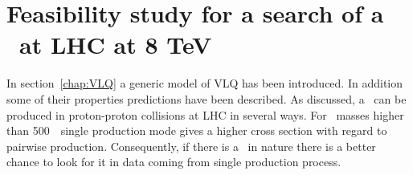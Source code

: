 %
%
%
%
%
%

\chapter{Feasibility study for a search of a \Tp~at LHC at 8 TeV}
\label{chap:pheno}

In section~\ref{chap:VLQ} a generic model of VLQ has been introduced. In addition some of their properties predictions have been described. As discussed, a \Tp~can be produced in proton-proton collisions at LHC in several ways. For \Tp~masses higher than 500~\GeVcc~single production mode gives a higher cross section with regard to pairwise production. Consequently, if there is a \Tp~in nature there is a better chance to look for it in data coming from single production process. 

